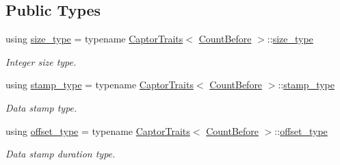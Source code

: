 \subsection*{Public Types}
\begin{DoxyCompactItemize}
\item 
\mbox{\label{classflow_1_1follower_1_1_count_before_a097b09f3a4af8a2a2772bfaddb00fdcc}} 
using \hyperlink{classflow_1_1follower_1_1_count_before_a097b09f3a4af8a2a2772bfaddb00fdcc}{size\+\_\+type} = typename \hyperlink{structflow_1_1_captor_traits}{Captor\+Traits}$<$ \hyperlink{classflow_1_1follower_1_1_count_before}{Count\+Before} $>$\+::\hyperlink{classflow_1_1follower_1_1_count_before_a097b09f3a4af8a2a2772bfaddb00fdcc}{size\+\_\+type}
\begin{DoxyCompactList}\small\item\em Integer size type. \end{DoxyCompactList}\item 
\mbox{\label{classflow_1_1follower_1_1_count_before_a9d39e5e485167849767fc463986525a6}} 
using \hyperlink{classflow_1_1follower_1_1_count_before_a9d39e5e485167849767fc463986525a6}{stamp\+\_\+type} = typename \hyperlink{structflow_1_1_captor_traits}{Captor\+Traits}$<$ \hyperlink{classflow_1_1follower_1_1_count_before}{Count\+Before} $>$\+::\hyperlink{classflow_1_1follower_1_1_count_before_a9d39e5e485167849767fc463986525a6}{stamp\+\_\+type}
\begin{DoxyCompactList}\small\item\em Data stamp type. \end{DoxyCompactList}\item 
\mbox{\label{classflow_1_1follower_1_1_count_before_a99a0abf1a1d75aad7a5b1958f527f0a8}} 
using \hyperlink{classflow_1_1follower_1_1_count_before_a99a0abf1a1d75aad7a5b1958f527f0a8}{offset\+\_\+type} = typename \hyperlink{structflow_1_1_captor_traits}{Captor\+Traits}$<$ \hyperlink{classflow_1_1follower_1_1_count_before}{Count\+Before} $>$\+::\hyperlink{classflow_1_1follower_1_1_count_before_a99a0abf1a1d75aad7a5b1958f527f0a8}{offset\+\_\+type}
\begin{DoxyCompactList}\small\item\em Data stamp duration type. \end{DoxyCompactList}\end{DoxyCompactItemize}
